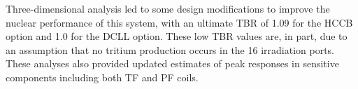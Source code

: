 Three-dimensional analysis led to some design modifications to improve the
nuclear performance of this system, with an ultimate \gls{TBR} of 1.09 for the
\gls{HCCB} option and 1.0 for the \gls{DCLL} option.  These low \gls{TBR}
values are, in part, due to an assumption that no tritium production occurs in
the 16 irradiation ports.  These analyses also provided updated estimates of
peak responses in sensitive components including both \gls{TF} and \gls{PF}
coils.

